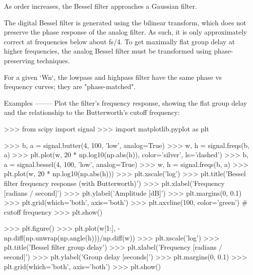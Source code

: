 \begin{DoxyVerb}
As order increases, the Bessel filter approaches a Gaussian filter.

The digital Bessel filter is generated using the bilinear
transform, which does not preserve the phase response of the analog
filter. As such, it is only approximately correct at frequencies
below about fs/4.  To get maximally flat group delay at higher
frequencies, the analog Bessel filter must be transformed using
phase-preserving techniques.

For a given `Wn`, the lowpass and highpass filter have the same phase vs
frequency curves; they are "phase-matched".

Examples
--------
Plot the filter's frequency response, showing the flat group delay and
the relationship to the Butterworth's cutoff frequency:

>>> from scipy import signal
>>> import matplotlib.pyplot as plt

>>> b, a = signal.butter(4, 100, 'low', analog=True)
>>> w, h = signal.freqs(b, a)
>>> plt.plot(w, 20 * np.log10(np.abs(h)), color='silver', ls='dashed')
>>> b, a = signal.bessel(4, 100, 'low', analog=True)
>>> w, h = signal.freqs(b, a)
>>> plt.plot(w, 20 * np.log10(np.abs(h)))
>>> plt.xscale('log')
>>> plt.title('Bessel filter frequency response (with Butterworth)')
>>> plt.xlabel('Frequency [radians / second]')
>>> plt.ylabel('Amplitude [dB]')
>>> plt.margins(0, 0.1)
>>> plt.grid(which='both', axis='both')
>>> plt.axvline(100, color='green') # cutoff frequency
>>> plt.show()

>>> plt.figure()
>>> plt.plot(w[1:], -np.diff(np.unwrap(np.angle(h)))/np.diff(w))
>>> plt.xscale('log')
>>> plt.title('Bessel filter group delay')
>>> plt.xlabel('Frequency [radians / second]')
>>> plt.ylabel('Group delay [seconds]')
>>> plt.margins(0, 0.1)
>>> plt.grid(which='both', axis='both')
>>> plt.show()\end{DoxyVerb}
 \hypertarget{namespacescipy_1_1signal_1_1filter__design_ad7b935998e2145ea375842f7a51e1364}{}
